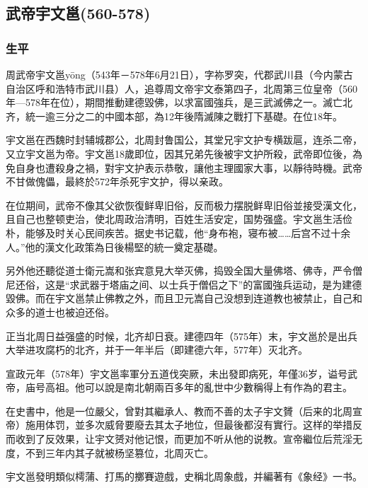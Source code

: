 
\subsection{武帝宇文邕\tiny(560-578)}

\subsubsection{生平}

周武帝宇文邕yōng（543年－578年6月21日），字祢罗突，代郡武川县（今内蒙古自治区呼和浩特市武川县）人，追尊周文帝宇文泰第四子，北周第三位皇帝（560年—578年在位），期間推動建德毀佛，以求富國強兵，是三武滅佛之一。滅亡北齐，統一逾三分之二的中國本部，為12年後隋滅陳之戰打下基礎。在位18年。

宇文邕在西魏时封辅城郡公，北周封鲁国公，其堂兄宇文护专横跋扈，连杀二帝，又立宇文邕为帝。宇文邕18歲即位，因其兄弟先後被宇文护所殺，武帝即位後，為免自身也遭殺身之禍，對宇文护表示恭敬，讓他主理國家大事，以靜待時機。武帝不甘做傀儡，最終於572年杀死宇文护，得以亲政。

在位期间，武帝不像其父欲恢復鲜卑旧俗，反而极力摆脱鲜卑旧俗並接受漢文化，且自己也整顿吏治，使北周政治清明，百姓生活安定，国势强盛。宇文邕生活俭朴，能够及时关心民间疾苦。据史书记载，他“身布袍，寝布被……后宫不过十余人。”他的漢文化政策為日後楊堅的統一奠定基礎。

另外他还聽從道士衛元嵩和张宾意見大举灭佛，捣毁全国大量佛塔、佛寺，严令僧尼还俗，这是“求武器于塔庙之间、以士兵于僧侣之下”的富國強兵运动，是为建德毀佛。而在宇文邕禁止佛教之外，而且卫元嵩自己没想到连道教也被禁止，自己和众多的道士也被迫还俗。

正当北周日益强盛的时候，北齐却日衰。建德四年（575年）末，宇文邕於是出兵大举进攻腐朽的北齐，并于一年半后（即建德六年，577年）灭北齐。

宣政元年（578年）宇文邕率軍分五道伐突厥，未出發即病死，年僅36岁，谥号武帝，庙号高祖。他可以說是南北朝兩百多年的亂世中少數稱得上有作為的君主。

在史書中，他是一位嚴父，曾對其繼承人、教而不善的太子宇文贇（后来的北周宣帝）施用体罚，並多次威脅要廢去其太子地位，但最後都沒有實行。这样的举措反而收到了反效果，让宇文赟对他记恨，而更加不听从他的说教。宣帝繼位后荒淫无度，不到三年内其子就被杨坚篡位，北周灭亡。

宇文邕發明類似樗蒲、打馬的擲賽遊戲，史稱北周象戲，并編著有《象经》一书。

